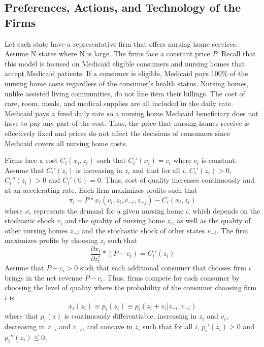 \documentclass[../Main.tex]{subfiles}
\begin{document}
\subsection{Preferences, Actions, and Technology of the Firms}
Let each state have a representative firm that offers nursing home services. Assume N states where N is large. The firms face a constant price $P$. Recall that this model is focused on Medicaid eligible consumers and nursing homes that accept Medicaid patients. If a consumer is eligible, Medicaid pays 100\% of the nursing home costs regardless of the consumer's health status. Nursing homes, unlike assisted living communities, do not line item their billings. The cost of care, room, meals, and medical supplies are all included in the daily rate. Medicaid pays a fixed daily rate so a nursing home Medicaid beneficiary does not have to pay any part of the cost. Thus, the price that nursing homes receive is effectively fixed and prices do not affect the decisions of consumers since Medicaid covers all nursing home costs.

Firms face a cost $C_i(x_i, z_i)$ such that $C_i'(x_i)= c_i$ where $c_i$ is constant. Assume that $C_i'(z_i)$ is increasing in $z_i$ and that for all $i$, $C_i'(z_i)>0$, $C_i''(z_i)>0$ and $C_i'(0)=0$. Thus, cost of quality increases continuously and at an accelerating rate. Each firm maximizes profits such that \begin{equation}\pi_i = P*x_i(v_i, z_i, v_{-i}, z_{-j}) -C_i(x_i, z_i) \end{equation} 
where $x_i$ represents the demand for a given nursing home $i$, which depends on the stochastic shock $v_i$ and the quality of nursing home $z_i$, as well as the quality of other nursing homes $z_{-i}$ and the stochastic shock of other states $v_{-i}$. The firm maximizes profits by choosing $z_i$ such that \begin{equation} \frac{\partial x_i}{\partial z_i^*}*(P-c_i)= C_i'(z_i) \end{equation} Assume that $P - c_i > 0$ such that each additional consumer that chooses firm $i$ brings in the net revenue $P - c_i$. Thus, firms compete for each consumer by choosing the level of quality where the probability of the consumer choosing firm $i$ is \begin{equation} x_{i}(z_i) \equiv p_i(z_i) \equiv p_i(z_i + v_i |z_{-i}, v_{-i}) \end{equation}
where that $p_{i}(z)$ is continuously differentiable, increasing in $z_i$ and $v_i$, decreasing in $z_{-i}$ and $v_{-i}$, and concave in $z_i$ such that for all $i$, $p_{i}'(z_i)\geq 0$ and $p_{i}''(z_i) \leq 0$.
\end{document}
